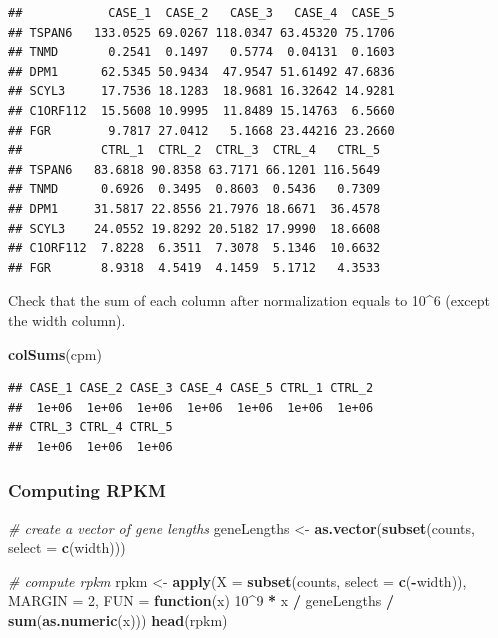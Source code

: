 \documentclass[12pt,]{krantz}
\newenvironment{Shaded}{\begin{snugshade}}{\end{snugshade}}
\newcommand{\CommentTok}[1]{\textcolor[rgb]{0.56,0.35,0.01}{\textit{#1}}}
\newcommand{\ControlFlowTok}[1]{\textcolor[rgb]{0.13,0.29,0.53}{\textbf{#1}}}
\newcommand{\DataTypeTok}[1]{\textcolor[rgb]{0.13,0.29,0.53}{#1}}
\newcommand{\DecValTok}[1]{\textcolor[rgb]{0.00,0.00,0.81}{#1}}
\newcommand{\KeywordTok}[1]{\textcolor[rgb]{0.13,0.29,0.53}{\textbf{#1}}}
\newcommand{\NormalTok}[1]{#1}
\newcommand{\OperatorTok}[1]{\textcolor[rgb]{0.81,0.36,0.00}{\textbf{#1}}}
\newcommand{\StringTok}[1]{\textcolor[rgb]{0.31,0.60,0.02}{#1}}
\begin{document}
\begin{verbatim}
##            CASE_1  CASE_2   CASE_3   CASE_4  CASE_5
## TSPAN6   133.0525 69.0267 118.0347 63.45320 75.1706
## TNMD       0.2541  0.1497   0.5774  0.04131  0.1603
## DPM1      62.5345 50.9434  47.9547 51.61492 47.6836
## SCYL3     17.7536 18.1283  18.9681 16.32642 14.9281
## C1ORF112  15.5608 10.9995  11.8489 15.14763  6.5660
## FGR        9.7817 27.0412   5.1668 23.44216 23.2660
##           CTRL_1  CTRL_2  CTRL_3  CTRL_4   CTRL_5
## TSPAN6   83.6818 90.8358 63.7171 66.1201 116.5649
## TNMD      0.6926  0.3495  0.8603  0.5436   0.7309
## DPM1     31.5817 22.8556 21.7976 18.6671  36.4578
## SCYL3    24.0552 19.8292 20.5182 17.9990  18.6608
## C1ORF112  7.8228  6.3511  7.3078  5.1346  10.6632
## FGR       8.9318  4.5419  4.1459  5.1712   4.3533
\end{verbatim}

Check that the sum of each column after normalization equals to 10\^{}6 (except the width column).

\begin{Shaded}
\begin{Highlighting}[]
\KeywordTok{colSums}\NormalTok{(cpm)}
\end{Highlighting}
\end{Shaded}

\begin{verbatim}
## CASE_1 CASE_2 CASE_3 CASE_4 CASE_5 CTRL_1 CTRL_2 
##  1e+06  1e+06  1e+06  1e+06  1e+06  1e+06  1e+06 
## CTRL_3 CTRL_4 CTRL_5 
##  1e+06  1e+06  1e+06
\end{verbatim}

\hypertarget{computing-rpkm}{%
\subsubsection{Computing RPKM}\label{computing-rpkm}}

\begin{Shaded}
\begin{Highlighting}[]
\CommentTok{# create a vector of gene lengths }
\NormalTok{geneLengths <-}\StringTok{ }\KeywordTok{as.vector}\NormalTok{(}\KeywordTok{subset}\NormalTok{(counts, }\DataTypeTok{select =} \KeywordTok{c}\NormalTok{(width)))}

\CommentTok{# compute rpkm }
\NormalTok{rpkm <-}\StringTok{ }\KeywordTok{apply}\NormalTok{(}\DataTypeTok{X =} \KeywordTok{subset}\NormalTok{(counts, }\DataTypeTok{select =} \KeywordTok{c}\NormalTok{(}\OperatorTok{-}\NormalTok{width)), }
                         \DataTypeTok{MARGIN =} \DecValTok{2}\NormalTok{, }
                         \DataTypeTok{FUN =} \ControlFlowTok{function}\NormalTok{(x) }\DecValTok{10}\OperatorTok{^}\DecValTok{9} \OperatorTok{*}\StringTok{ }\NormalTok{x }\OperatorTok{/}\StringTok{ }\NormalTok{geneLengths }\OperatorTok{/}\StringTok{ }\KeywordTok{sum}\NormalTok{(}\KeywordTok{as.numeric}\NormalTok{(x)))}
\KeywordTok{head}\NormalTok{(rpkm)}
\end{Highlighting}
\end{Shaded}
\end{document}
